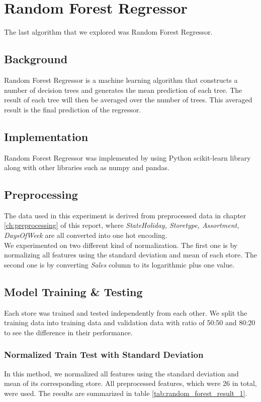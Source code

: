 \section{Random Forest Regressor} \label{sec:rf}
The last algorithm that we explored was Random Forest Regressor.

\subsection{Background}
Random Forest Regressor is a machine learning algorithm that constructs a number of decision trees and generates the mean prediction of each tree. The result of each tree will then be averaged over the number of trees. This averaged result is the final prediction of the regressor. 

\subsection{Implementation}
Random Forest Regressor was implemented by using Python scikit-learn library along with other libraries such as numpy and pandas.

\subsection{Preprocessing}
The data used in this experiment is derived from preprocessed data in chapter \ref{ch:preprocessing} of this report, where \textit{StateHoliday, Storetype, Assortment, DaysOfWeek} are all converted into one hot encoding.\\
We experimented on two different kind of normalization. The first one is by normalizing all features using the standard deviation and mean of each store. The second one is by converting \textit{Sales} column to its logarithmic plus one value.  

\subsection{Model Training \& Testing}
Each store was trained and tested independently from each other. We split the training data into training data and validation data with ratio of 50:50 and 80:20 to see the difference in their performance. 

\subsubsection{Normalized Train Test with Standard Deviation}
In this method, we normalized all features using the standard deviation and mean of its corresponding store. All preprocessed features, which were 26 in total, were used. The results are summarized in table \ref{tab:random_forest_result_1}.

